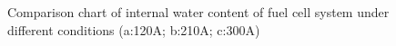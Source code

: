 \begin{figure}
	\label{fig:figure8}
	\caption{Comparison chart of internal water content of fuel cell system under different conditions (a:120A; b:210A; c:300A)}
\end{figure}

